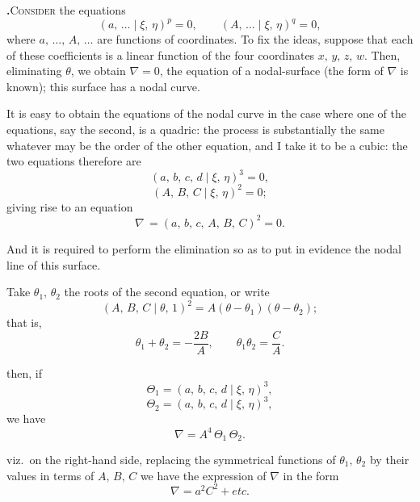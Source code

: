 \documentclass[11pt]{article}
\newcommand{\artno}[1]{\textbf{#1.}\quad}
\begin{document}
\bigskip

\noindent
\artno{}\textsc{Consider} the equations
\[
(a,\,\ldots \mid \xi,\,\eta)^p = 0,\qquad (A,\,\ldots \mid \xi,\,\eta)^q = 0,
\]
where $a,\,\ldots,\,A,\,\ldots$ are functions of coordinates. To fix the ideas, suppose that each
of these coefficients is a linear function of the four coordinates $x,\,y,\,z,\,w$. Then,
eliminating $\theta$, we obtain $\nabla = 0$, the equation of a nodal-surface (the form of $\nabla$ is known); this
surface has a nodal curve.

\medskip

\noindent
It is easy to obtain the equations of the nodal curve in the case where one of
the equations, say the second, is a quadric: the process is substantially the same
whatever may be the order of the other equation, and I take it to be a cubic:
the two equations therefore are
\[
(a,\,b,\,c,\,d \mid \xi,\,\eta)^3 = 0,
\]
\[
(A,\,B,\,C \mid \xi,\,\eta)^2 = 0;
\]
giving rise to an equation
\[
\nabla\, = (a,\,b,\,c,\,A,\,B,\,C)^2 = 0.
\]

\medskip

\noindent
And it is required to perform the elimination so as to put in evidence the nodal
line of this surface.

\medskip

\noindent
Take $\theta_1,\,\theta_2$ the roots of the second equation, or write
\[
(A,\,B,\,C \mid \theta,\,1)^2 = A(\theta - \theta_1)(\theta - \theta_2);
\]
that is,
\[
\theta_1 + \theta_2 = -\frac{2B}{A},\qquad \theta_1\theta_2 = \frac{C}{A}.
\]

\newpage

\noindent
then, if
\[
\Theta_1 = (a,\,b,\,c,\,d \mid \xi,\,\eta)^3,
\]
\[
\Theta_2 = (a,\,b,\,c,\,d \mid \xi,\,\eta)^3,
\]
we have
\[
\nabla = A^4\,\Theta_1\,\Theta_2.
\]

\medskip

\noindent
viz.\ on the right-hand side, replacing the symmetrical functions of $\theta_1,\,\theta_2$ by their
values in terms of $A,\,B,\,C$ we have the expression of $\nabla$ in the form
\[
\nabla = a^2 C^2 + \mathit{etc.}
\]

\medskip
\end{document}
